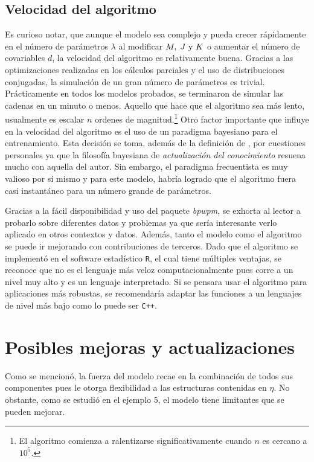 \documentclass[../Main/Main.tex]{subfiles}
\begin{document}
\subsection*{Velocidad del algoritmo}
Es curioso notar, que aunque el modelo sea complejo y pueda crecer rápidamente en el número de parámetros $\lambda$ al modificar $M,\;J\text{ y }K$ o aumentar el número de covariables $d$, la velocidad del algoritmo es relativamente buena. Gracias a las optimizaciones realizadas en los cálculos parciales y el uso de distribuciones conjugadas, la simulación de un gran número de parámetros es trivial. Prácticamente en todos los modelos probados, se terminaron de simular las cadenas en un minuto o menos. Aquello que hace que el algoritmo sea más lento, usualmente es escalar $n$ ordenes de magnitud.\footnote{El algoritmo comienza a ralentizarse significativamente cuando $n$ es cercano a $10^5$.} Otro factor importante que influye en la velocidad del algoritmo es el uso de un paradigma bayesiano para el entrenamiento. Esta decisión se toma, además de la definición de \citet{albert1993bayesian}, por cuestiones personales ya que la filosofía bayesiana de \textit{actualización del conocimiento} resuena mucho con aquella del autor. Sin embargo, el paradigma frecuentista es muy valioso por sí mismo y para este modelo, habría logrado que el algoritmo fuera casi instantáneo para un número grande de parámetros.

Gracias a la fácil disponibilidad y uso del paquete \textit{bpwpm}, se exhorta al lector a probarlo sobre diferentes datos y problemas ya que sería interesante verlo aplicado en otros contextos y datos. Además, tanto el modelo como el algoritmo se puede ir mejorando con contribuciones de terceros. Dado que el algoritmo se implementó en el software estadístico \verb|R|, el cual tiene múltiples ventajas, se reconoce que no es el lenguaje más veloz computacionalmente pues corre a un nivel muy alto y es un lenguaje interpretado. Si se pensara usar el algoritmo para aplicaciones más robustas, se recomendaría adaptar las funciones a un lenguajes de nivel más bajo como lo puede ser \verb|C++|.

\section{Posibles mejoras y actualizaciones}
Como se mencionó, la fuerza del modelo recae en la combinación de todos sus componentes pues le otorga flexibilidad a las estructuras contenidas en $\eta$. No obstante, como se estudió en el ejemplo 5, el modelo tiene limitantes que se pueden mejorar. 
\end{document}
